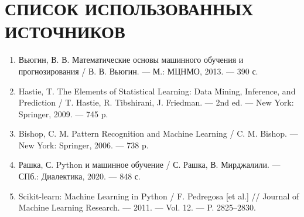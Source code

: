 \documentclass[14pt,a4paper]{extarticle}
\begin{document}
\section*{СПИСОК ИСПОЛЬЗОВАННЫХ ИСТОЧНИКОВ}

\begin{enumerate}
  \item Вьюгин, В. В. Математические основы машинного обучения и прогнозирования / В. В. Вьюгин. --- М.: МЦНМО, 2013. --- 390 с.
  \item Hastie, T. The Elements of Statistical Learning: Data Mining, Inference, and Prediction / T. Hastie, R. Tibshirani, J. Friedman. --- 2nd ed. --- New York: Springer, 2009. --- 745 p.
  \item Bishop, C. M. Pattern Recognition and Machine Learning / C. M. Bishop. --- New York: Springer, 2006. --- 738 p.
  \item Рашка, С. Python и машинное обучение / С. Рашка, В. Мирджалили. --- СПб.: Диалектика, 2020. --- 848 с.
  \item Scikit-learn: Machine Learning in Python / F. Pedregosa [et al.] // Journal of Machine Learning Research. --- 2011. --- Vol. 12. --- P. 2825--2830.
\end{enumerate}
\end{document}
